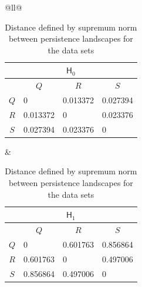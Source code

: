 \documentclass[sn-mathphys-num]{sn-jnl}%
\theoremstyle{thmstyleone}%
\theoremstyle{thmstyletwo}%
\theoremstyle{thmstylethree}%
\begin{document}
\begin{table}[h]
	\centering
	\caption{Distance defined by supremum norm between persistence landscapes for the data sets}
	\begin{tabular}{@{}ll@{}}
		\begin{tabular}{@{}clll@{}}
			\multicolumn{4}{c}{$\mathsf{H}_0$}                                                \\ \toprule
			& \multicolumn{1}{c}{$Q$} & \multicolumn{1}{c}{$R$} & \multicolumn{1}{c}{$S$} \\ \midrule
			$Q$ & 0                       & 0.013372                & 0.027394                \\
			$R$ & 0.013372                & 0                       & 0.023376                \\
			$S$ & 0.027394                & 0.023376                & 0                       \\ \bottomrule
		\end{tabular}
		&
		\begin{tabular}{@{}clll@{}}
			\multicolumn{4}{c}{$\mathsf{H}_1$}                                                \\ \toprule
			& \multicolumn{1}{c}{$Q$} & \multicolumn{1}{c}{$R$} & \multicolumn{1}{c}{$S$} \\ \midrule
			$Q$ & 0                       & 0.601763                & 0.856864                \\
			$R$ & 0.601763                & 0                       & 0.497006                \\
			$S$ & 0.856864                & 0.497006                & 0                       \\ \bottomrule
		\end{tabular}
	\end{tabular}
	\label{table: supremum distance}
\end{table}
\end{document}
